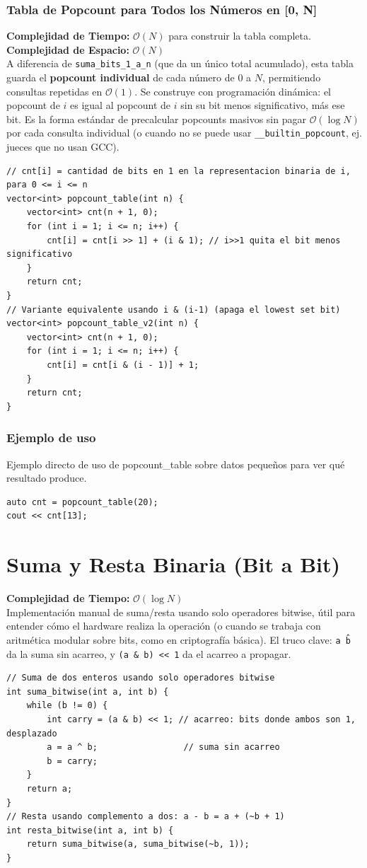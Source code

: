 \documentclass[10pt,twocolumn,letterpaper]{report}
\begin{document}
\subsubsection{Tabla de Popcount para Todos los Números en [0, N]}
\textbf{Complejidad de Tiempo:} $\mathcal{O}(N)$ para construir la tabla completa. \\
\textbf{Complejidad de Espacio:} $\mathcal{O}(N)$ \\
A diferencia de \texttt{suma\_bits\_1\_a\_n} (que da un único total acumulado), esta tabla guarda el \textbf{popcount individual} de cada número de $0$ a $N$, permitiendo consultas repetidas en $\mathcal{O}(1)$. Se construye con programación dinámica: el popcount de $i$ es igual al popcount de $i$ sin su bit menos significativo, más ese bit. Es la forma estándar de precalcular popcounts masivos sin pagar $\mathcal{O}(\log N)$ por cada consulta individual (o cuando no se puede usar \texttt{\_\_builtin\_popcount}, ej. jueces que no usan GCC).
\begin{lstlisting}
// cnt[i] = cantidad de bits en 1 en la representacion binaria de i, para 0 <= i <= n
vector<int> popcount_table(int n) {
    vector<int> cnt(n + 1, 0);
    for (int i = 1; i <= n; i++) {
        cnt[i] = cnt[i >> 1] + (i & 1); // i>>1 quita el bit menos significativo
    }
    return cnt;
}
// Variante equivalente usando i & (i-1) (apaga el lowest set bit)
vector<int> popcount_table_v2(int n) {
    vector<int> cnt(n + 1, 0);
    for (int i = 1; i <= n; i++) {
        cnt[i] = cnt[i & (i - 1)] + 1;
    }
    return cnt;
}
\end{lstlisting}
\subsubsection*{Ejemplo de uso}
Ejemplo directo de uso de popcount\_table sobre datos pequeños para ver qué resultado produce.
\begin{lstlisting}
auto cnt = popcount_table(20);
cout << cnt[13];
\end{lstlisting}

\section{Suma y Resta Binaria (Bit a Bit)}
\textbf{Complejidad de Tiempo:} $\mathcal{O}(\log N)$ \\
Implementación manual de suma/resta usando solo operadores bitwise, útil para entender cómo el hardware realiza la operación (o cuando se trabaja con aritmética modular sobre bits, como en criptografía básica). El truco clave: \texttt{a \^ b} da la suma sin acarreo, y \texttt{(a \& b) << 1} da el acarreo a propagar.
\begin{lstlisting}
// Suma de dos enteros usando solo operadores bitwise
int suma_bitwise(int a, int b) {
    while (b != 0) {
        int carry = (a & b) << 1; // acarreo: bits donde ambos son 1, desplazado
        a = a ^ b;                 // suma sin acarreo
        b = carry;
    }
    return a;
}
// Resta usando complemento a dos: a - b = a + (~b + 1)
int resta_bitwise(int a, int b) {
    return suma_bitwise(a, suma_bitwise(~b, 1));
}
\end{lstlisting}
\end{document}
